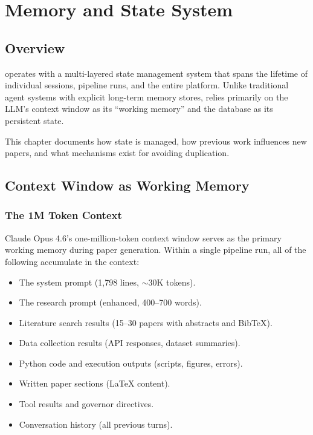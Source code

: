 \chapter{Memory and State System}
\label{ch:memory}

\section{Overview}
\label{sec:memory:overview}

\autoscholar operates with a multi-layered state management system that spans the lifetime of individual sessions, pipeline runs, and the entire platform.
Unlike traditional agent systems with explicit long-term memory stores, \autoscholar relies primarily on the LLM's context window as its ``working memory'' and the database as its persistent state.

This chapter documents how state is managed, how previous work influences new papers, and what mechanisms exist for avoiding duplication.

\section{Context Window as Working Memory}
\label{sec:memory:context}

\subsection{The 1M Token Context}

Claude Opus 4.6's one-million-token context window serves as the primary working memory during paper generation.
Within a single pipeline run, all of the following accumulate in the context:

\begin{itemize}
  \item The system prompt (1,798 lines, $\sim$30K tokens).
  \item The research prompt (enhanced, 400--700 words).
  \item Literature search results (15--30 papers with abstracts and BibTeX).
  \item Data collection results (API responses, dataset summaries).
  \item Python code and execution outputs (scripts, figures, errors).
  \item Written paper sections (\LaTeX{} content).
  \item Tool results and governor directives.
  \item Conversation history (all previous turns).
\end{itemize}


